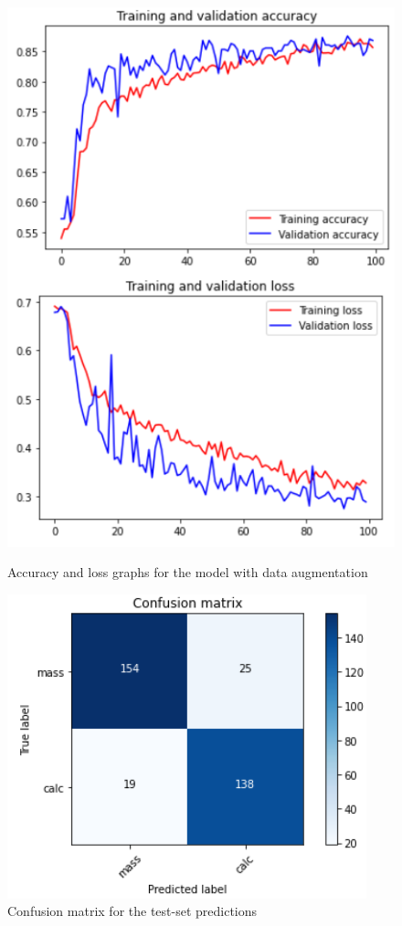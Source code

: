 \documentclass[11pt,a4paper,oneside]{article}
\begin{document}
\begin{figure}[h]
\centering
	\begin{minipage}[c]{.4\textwidth}
		\centering\setlength{\captionmargin}{0pt}%
		\includegraphics[width=.9\textwidth]{images/2.1-da/da_accuracy}
		\caption{Accuracy and loss graphs for the model with data augmentation}
		\label{fig:scratch_accuracy_da}
	\end{minipage}
	\hspace{5mm}%
	\begin{minipage}[c]{.4\textwidth}
		\centering\setlength{\captionmargin}{0pt}%
		\includegraphics[width=.9\textwidth]{images/2.1-da/da_matrix}
		\caption{Confusion matrix for the test-set predictions}
		\label{fig:scratch_matrix_da}
	\end{minipage}%
\end{figure}
\end{document}
